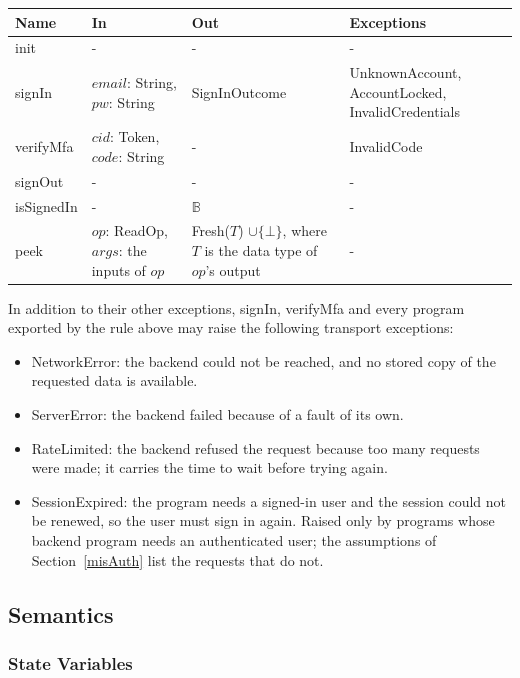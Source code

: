 \documentclass[12pt, titlepage]{article}
\begin{document}
\begin{center}
\renewcommand{\arraystretch}{1.2}
\begin{tabular}{>{\raggedright\arraybackslash}p{3.3cm}
  >{\raggedright\arraybackslash}p{4.4cm}
  >{\raggedright\arraybackslash}p{3cm}
  >{\raggedright\arraybackslash}p{3.6cm}}
\toprule
\textbf{Name} & \textbf{In} & \textbf{Out} & \textbf{Exceptions} \\
\midrule
init & - & - & - \\
signIn & $\mathit{email}$: String, $\mathit{pw}$: String & SignInOutcome &
  UnknownAccount, AccountLocked, InvalidCredentials \\
verifyMfa & $\mathit{cid}$: Token, $\mathit{code}$: String & - &
  InvalidCode \\
signOut & - & - & - \\
isSignedIn & - & $\mathbb{B}$ & - \\
peek & $\mathit{op}$: ReadOp, $\mathit{args}$: the inputs of $\mathit{op}$
  & Fresh($T$) $\cup \{\bot\}$, where $T$ is the data type of
  $\mathit{op}$'s output & - \\
\bottomrule
\end{tabular}
\end{center}

\noindent In addition to their other exceptions, signIn, verifyMfa and every
program exported by the rule above may raise the following transport
exceptions:
\begin{itemize}
\item NetworkError: the backend could not be reached, and no stored copy of
  the requested data is available.
\item ServerError: the backend failed because of a fault of its own.
\item RateLimited: the backend refused the request because too many requests
  were made; it carries the time to wait before trying again.
\item SessionExpired: the program needs a signed-in user and the session
  could not be renewed, so the user must sign in again. Raised only by
  programs whose backend program needs an authenticated user; the
  assumptions of Section~\ref{misAuth} list the requests that do not.
\end{itemize}

\subsection{Semantics}

\subsubsection{State Variables}
\end{document}
